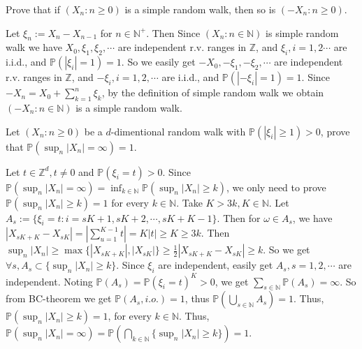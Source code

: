 \documentclass{ctexart}
\newif\ifpreface
\begin{document}
\large
\iffalse
  \setlength{\baselineskip}{1.2em}
  \ifpreface
    
  \else
    \maketitle
  \fi
\fi
{}

\begin{problem}\label{pro:1}
  Prove that if \((X_n:n \geq 0)\) is a simple random walk, then so is \((-X_n:n \geq 0)\).
\end{problem}

\begin{solution}
  Let \(\xi_n:=X_n-X_{n-1}\) for \(n \in \mathbb{N}^+\). Then Since \((X_n:n \in \mathbb{N})\) is simple random walk we have
  \(X_0,\xi_1,\xi_2,\cdots\) are independent r.v. ranges in \(\mathbb{Z}\), and
  \(\xi_i,i=1,2\cdots\) are i.i.d., and \(\mathbb{P}(|\xi_i|=1)=1\).
  So we easily get \(-X_0,-\xi_1,-\xi_2,\cdots\) are independent r.v. ranges in \(\mathbb{Z}\),
  and \(-\xi_i,i=1,2,\cdots\) are i.i.d., and \(\mathbb{P}(|-\xi_i|=1)=1\).
  Since \(-X_n=X_0+\sum_{k=1}^{n}\xi_k\), by the definition of simple random walk we obtain \((-X_n:n \in \mathbb{N})\) is a simple random walk.
\end{solution}

\begin{problem}\label{pro:2}
  Let \((X_n:n \geq 0)\) be a \(d\)-dimentional random walk with \(\mathbb{P}(|\xi_i|\geq 1)>0\), prove that \(\mathbb{P}(\sup_{n}|X_n|=\infty)=1\).
\end{problem}
\begin{solution}
  Let \(t \in \mathbb{Z}^d,t \neq 0\) and \(\mathbb{P}(\xi_i=t)>0\).
  Since \(\mathbb{P}(\sup_{n}|X_n|=\infty)=\inf_{k \in \mathbb{N}}\mathbb{P}(\sup_{n}|X_n| \geq k)\),
  we only need to prove \(\mathbb{P}(\sup_{n}|X_n|\geq k)=1\) for every \(k \in \mathbb{N}\).
  Take \(K>3k,K \in \mathbb{N}\).
  Let \(A_s:=\{\xi_i=t:i=sK+1,sK+2,\cdots,sK+K-1\}\).
  Then for \(\omega \in A_s\), we have \(|X_{sK+K}-X_{sK}|=|\sum_{u=1}^{K-1} t|=K|t|\geq K \geq 3k\).
  Then \(\sup_n|X_n|\geq \max\{|X_{sK+K}|,|X_{sK}|\}\geq \frac{1}{2}|X_{sK+K}-X_{sK}|\geq k\).
  So we get \(\forall s,A_s \subset \{\sup_n|X_n| \geq k\}\).
  Since \(\xi_i\) are independent, easily get \(A_s,s=1,2,\cdots\) are independent.
  Noting \(\mathbb{P}(A_s)=\mathbb{P}(\xi_i=t)^K>0\), we get \(\sum_{s \in \mathbb{N}} \mathbb{P}(A_s)=\infty\).
  So from BC-theorem we get \(\mathbb{P}(A_s,i.o.)=1\), thus \(\mathbb{P}(\bigcup_{s \in \mathbb{N}}A_s)=1\).
  Thus, \(\mathbb{P}(\sup_n|X_n| \geq k)=1\), for every \(k \in \mathbb{N}\).
  Thus, \(\mathbb{P}(\sup_n|X_n|=\infty)=\mathbb{P}(\bigcap_{k \in \mathbb{N}}\{\sup_n|X_n|\geq k\})=1\).
\end{solution}
\end{document}
